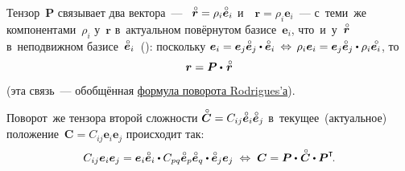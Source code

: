 \begin{otherlanguage}{russian}
\vspace{-0.4em} Тензор~$\bm{P}$ связывает два вектора~--- ~${\mathcircabove{\bm{r}} = \rho_i \mathcircabove{\bm{e}}_i}$ и~~${\bm{r} = \rho_i \bm{e}_i}$~--- с~теми~же компонентами~$\rho_i$ у~$\bm{r}$ в~актуальном повёрнутом базисе~${\bm{e}_i}$, что~и~у~${\mathcircabove{\bm{r}}}$ в~неподвижном базисе~${\mathcircabove{\bm{e}}_i}$~(): поскольку ${\bm{e}_i = \bm{e}_j \mathcircabove{\bm{e}}_j \dotp \mathcircabove{\bm{e}}_i \:\Leftrightarrow\, \rho_i \bm{e}_i = \bm{e}_j \mathcircabove{\bm{e}}_j \dotp \rho_i \mathcircabove{\bm{e}_i}}$, то
\begin{equation}\label{rodriguesrotationformula}
\bm{r} = \bm{P} \dotp\hspace{0.2ex} \mathcircabove{\bm{r}}
\end{equation}

\vspace{-0.4em} \noindent(эта связь~--- обобщённая \href{https://fr.wikipedia.org/wiki/Rotation_vectorielle#Cas_g%C3%A9n%C3%A9ral}{формула поворота Rodrigues’а}).

\vspace{-0.1em}Поворот~же тензора второй сложности ${\mathcircabove{\bm{C}} = C_{ij} \mathcircabove{\bm{e}}_i \mathcircabove{\bm{e}}_j}$ в~текущее~(актуальное) положение~${\bm{C} = C_{ij} \bm{e}_i \bm{e}_j}$ происходит так:
\begin{equation}
C_{ij} \bm{e}_i \bm{e}_j = \bm{e}_i \mathcircabove{\bm{e}}_i \dotp C_{pq} \mathcircabove{\bm{e}}_p \mathcircabove{\bm{e}}_q \dotp \mathcircabove{\bm{e}}_j \bm{e}_j \;\Leftrightarrow\; \bm{C} = \bm{P} \dotp\hspace{0.1ex} \mathcircabove{\bm{C}} \dotp \bm{P}^{\T} \hspace{-0.32ex}.
\end{equation}


\end{otherlanguage}
